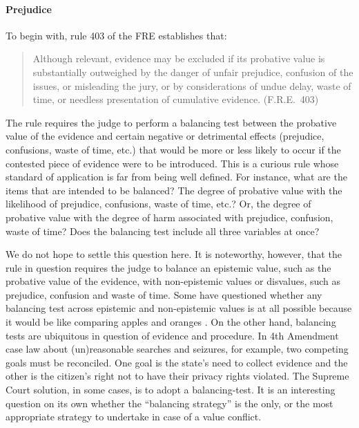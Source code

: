 \documentclass[10pt]{article}
\begin{document}
\paragraph{Prejudice}
To begin with, rule 403 of the FRE 
establishes that:
%
\begin{quote}
\begin{singlespace}
Although relevant, evidence may be excluded if its probative value is substantially outweighed by the danger of unfair prejudice, confusion of the issues, or misleading the jury, or by considerations of undue delay, waste of time, or needless presentation of cumulative evidence. (F.R.E.\ 403)
\end{singlespace}
\end{quote}
%
The rule requires the judge to perform a balancing test between the probative value of the evidence 
and certain negative or detrimental effects (prejudice, confusions, waste of time, etc.) that 
would be more or less likely to occur if the contested piece of evidence were to be introduced.
This is a curious rule whose standard of application is far from being 
well defined. For instance, what are the items that are intended to be balanced? 
The degree of probative value with the likelihood of prejudice, confusions, waste of time, etc.? 
Or, the degree of probative value with the degree of harm associated with prejudice, confusion, waste of time? Does the balancing 
test include all three variables at once? 

We do not hope to settle this question here. It is noteworthy, however, that the rule in question requires the judge to balance an 
epistemic value, such as the probative value of the evidence, with non-epistemic values or disvalues, 
such as prejudice, confusion and waste of time. %
Some have questioned whether any balancing test across epistemic and non-epistemic values is at all 
possible because it would be like comparing apples and oranges \cite{taruffo09}. On the other hand, balancing tests are ubiquitous 
in question of evidence and procedure. 
In 4th Amendment case law about (un)reasonable searches and seizures, for example, two competing goals must be reconciled. One goal is the state's need to collect evidence and the other is the citizen's 
right not to have their privacy rights violated. The Supreme Court solution, in some cases, is to adopt a balancing-test. It is an interesting question on its own
whether the ``balancing strategy'' is the only, or the most appropriate strategy to undertake in case of a value conflict.
\end{document}
